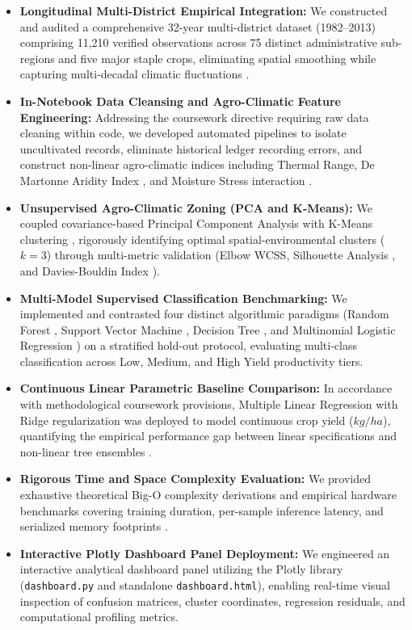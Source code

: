 \documentclass[conference]{IEEEtran}
\begin{document}
\begin{itemize}
    \item \textbf{Longitudinal Multi-District Empirical Integration:} We constructed and audited a comprehensive 32-year multi-district dataset (1982--2013) comprising 11,210 verified observations across 75 distinct administrative sub-regions and five major staple crops, eliminating spatial smoothing while capturing multi-decadal climatic fluctuations \cite{dhakal2023, lobell2008}.
    \item \textbf{In-Notebook Data Cleansing and Agro-Climatic Feature Engineering:} Addressing the coursework directive requiring raw data cleaning within code, we developed automated pipelines to isolate uncultivated records, eliminate historical ledger recording errors, and construct non-linear agro-climatic indices including Thermal Range, De Martonne Aridity Index \cite{demartonne1926}, and Moisture Stress interaction \cite{schlenker2009}.
    \item \textbf{Unsupervised Agro-Climatic Zoning (PCA and K-Means):} We coupled covariance-based Principal Component Analysis \cite{hotelling1933} with K-Means clustering \cite{macqueen1967}, rigorously identifying optimal spatial-environmental clusters ($k=3$) through multi-metric validation (Elbow WCSS, Silhouette Analysis \cite{rousseeuw1987}, and Davies-Bouldin Index \cite{davies1979}).
    \item \textbf{Multi-Model Supervised Classification Benchmarking:} We implemented and contrasted four distinct algorithmic paradigms (Random Forest \cite{breiman2001}, Support Vector Machine \cite{cortes1995}, Decision Tree \cite{quinlan1986}, and Multinomial Logistic Regression \cite{hastie2009}) on a stratified hold-out protocol, evaluating multi-class classification across Low, Medium, and High Yield productivity tiers.
    \item \textbf{Continuous Linear Parametric Baseline Comparison:} In accordance with methodological coursework provisions, Multiple Linear Regression with Ridge regularization \cite{hoerl1970} was deployed to model continuous crop yield ($kg/ha$), quantifying the empirical performance gap between linear specifications and non-linear tree ensembles \cite{crane2018, breiman2001}.
    \item \textbf{Rigorous Time and Space Complexity Evaluation:} We provided exhaustive theoretical Big-O complexity derivations and empirical hardware benchmarks covering training duration, per-sample inference latency, and serialized memory footprints \cite{hastie2009}.
    \item \textbf{Interactive Plotly Dashboard Panel Deployment:} We engineered an interactive analytical dashboard panel utilizing the Plotly library (\texttt{dashboard.py} and standalone \texttt{dashboard.html}), enabling real-time visual inspection of confusion matrices, cluster coordinates, regression residuals, and computational profiling metrics.
\end{itemize}
\end{document}

